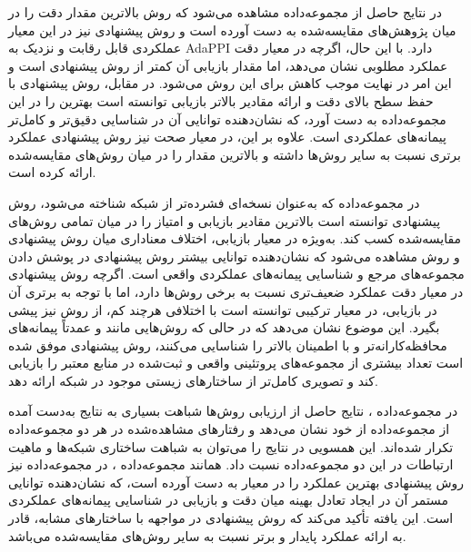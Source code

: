 در نتایج حاصل از مجموعه‌داده  مشاهده می‌شود که روش  بالاترین مقدار دقت را در میان پژوهش‌های مقایسه‌شده به دست آورده است و روش پیشنهادی نیز در این معیار عملکردی قابل‌ رقابت و نزدیک به AdaPPI دارد. با این حال، اگرچه  در معیار دقت عملکرد مطلوبی نشان می‌دهد، اما مقدار بازیابی آن کمتر از روش پیشنهادی است و این امر در نهایت موجب کاهش  برای این روش می‌شود. در مقابل، روش پیشنهادی با حفظ سطح بالای دقت و ارائه مقادیر بالاتر بازیابی توانسته است بهترین  را در این مجموعه‌داده به دست آورد، که نشان‌دهنده توانایی آن در شناسایی دقیق‌تر و کامل‌تر پیمانه‌های عملکردی است. علاوه بر این، در معیار صحت نیز روش پیشنهادی عملکرد برتری نسبت به سایر روش‌ها داشته و بالاترین مقدار را در میان روش‌های مقایسه‌شده ارائه کرده است.

در مجموعه‌داده  که به‌عنوان نسخه‌ای فشرده‌تر از شبکه  شناخته می‌شود، روش پیشنهادی توانسته است بالاترین مقادیر بازیابی و امتیاز  را در میان تمامی روش‌های مقایسه‌شده کسب کند. به‌ویژه در معیار بازیابی، اختلاف معناداری میان روش پیشنهادی و روش  مشاهده می‌شود که نشان‌دهنده توانایی بیشتر روش پیشنهادی در پوشش دادن مجموعه‌های مرجع و شناسایی پیمانه‌های عملکردی واقعی است. اگرچه روش پیشنهادی در معیار دقت عملکرد ضعیف‌تری نسبت به برخی روش‌ها دارد، اما با توجه به برتری آن در بازیابی، در معیار ترکیبی  توانسته است با اختلافی هرچند کم، از روش  نیز پیشی بگیرد. این موضوع نشان می‌دهد که در حالی که روش‌هایی مانند  و  عمدتاً پیمانه‌های محافظه‌کارانه‌تر و با اطمینان بالاتر را شناسایی می‌کنند، روش پیشنهادی موفق شده است تعداد بیشتری از مجموعه‌های پروتئینی واقعی و ثبت‌شده در منابع معتبر را بازیابی کند و تصویری کامل‌تر از ساختارهای زیستی موجود در شبکه ارائه دهد.

در مجموعه‌داده ، نتایج حاصل از ارزیابی روش‌ها شباهت بسیاری به نتایج به‌دست‌ آمده از مجموعه‌داده  از خود نشان می‌دهد و رفتارهای مشاهده‌شده در هر دو مجموعه‌داده تکرار شده‌اند. این همسویی در نتایج را می‌توان به شباهت ساختاری شبکه‌ها و ماهیت ارتباطات در این دو مجموعه‌داده نسبت داد. همانند مجموعه‌داده ، در مجموعه‌داده  نیز روش پیشنهادی بهترین عملکرد را در معیار  به دست آورده است، که نشان‌دهنده توانایی مستمر آن در ایجاد تعادل بهینه میان دقت و بازیابی در شناسایی پیمانه‌های عملکردی است. این یافته تأکید می‌کند که روش پیشنهادی در مواجهه با ساختارهای مشابه، قادر به ارائه عملکرد پایدار و برتر نسبت به سایر روش‌های مقایسه‌شده می‌باشد.


